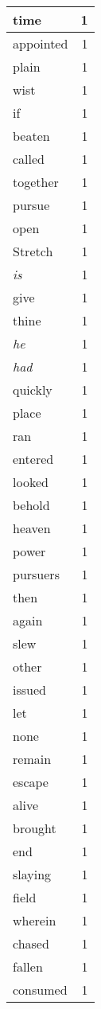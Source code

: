 \begin{center}
\begin{longtable}{l|r}
time & 1\\ \hline 
appointed & 1\\ \hline 
plain & 1\\ \hline 
wist & 1\\ \hline 
if & 1\\ \hline 
beaten & 1\\ \hline 
called & 1\\ \hline 
together & 1\\ \hline 
pursue & 1\\ \hline 
open & 1\\ \hline 
Stretch & 1\\ \hline 
\emph{is} & 1\\ \hline 
give & 1\\ \hline 
thine & 1\\ \hline 
\emph{he} & 1\\ \hline 
\emph{had} & 1\\ \hline 
quickly & 1\\ \hline 
place & 1\\ \hline 
ran & 1\\ \hline 
entered & 1\\ \hline 
looked & 1\\ \hline 
behold & 1\\ \hline 
heaven & 1\\ \hline 
power & 1\\ \hline 
pursuers & 1\\ \hline 
then & 1\\ \hline 
again & 1\\ \hline 
slew & 1\\ \hline 
other & 1\\ \hline 
issued & 1\\ \hline 
let & 1\\ \hline 
none & 1\\ \hline 
remain & 1\\ \hline 
escape & 1\\ \hline 
alive & 1\\ \hline 
brought & 1\\ \hline 
end & 1\\ \hline 
slaying & 1\\ \hline 
field & 1\\ \hline 
wherein & 1\\ \hline 
chased & 1\\ \hline 
fallen & 1\\ \hline 
consumed & 1\\ \hline 

\end{longtable}
\end{center}
